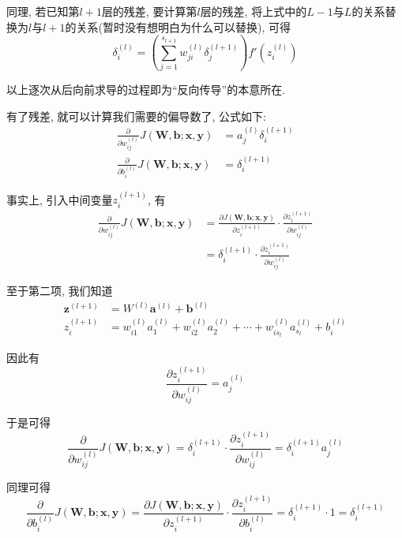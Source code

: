 \documentclass[a4paper,UTF8]{ctexart}
\theoremstyle{plain} \newtheorem{theorem}{定理}[section]
\theoremstyle{plain} \newtheorem{definition}{定义}[section]
\theoremstyle{plain} \newtheorem{lemma}{引理}[section]
\theoremstyle{plain} \newtheorem{proposition}{命题}[section]
\theoremstyle{plain} \newtheorem{example}{例}[section]
\theoremstyle{plain} \newtheorem{remark}{注}[section]
\theoremstyle{plain} \newtheorem{corollary}{推论}[section]
\begin{document}
\begin{enumerate}[(1)]
同理, 若已知第$l + 1$层的残差, 要计算第$l$层的残差, 将上式中的$L - 1$与$L$的关系替换为$l$与$l + 1$的关系(暂时没有想明白为什么可以替换), 可得
\begin{equation*}
\delta_{i}^{(l)} = \left( \sum_{j=1}^{s_{l+1}} w_{ji}^{(l)} \delta_{j}^{(l+1)} \right) f'(z_{i}^{(l)})
\end{equation*}

以上逐次从后向前求导的过程即为“反向传导”的本意所在.
\end{enumerate}

有了残差, 就可以计算我们需要的偏导数了, 公式如下:
\begin{align*}
\frac{\partial}{\partial w_{ij}^{(l)}} J(\bm{W},\bm{b};\bm{x},\bm{y}) & = a_{j}^{(l)} \delta_{i}^{(l+1)} \\ 
\frac{\partial}{\partial b_{i}^{(l)}} J(\bm{W},\bm{b};\bm{x},\bm{y}) & = \delta_{i}^{(l+1)}
\end{align*}

事实上, 引入中间变量$z_{i}^{(l+1)}$, 有
\begin{align*}
\frac{\partial}{\partial w_{ij}^{(l)}} J(\bm{W},\bm{b};\bm{x},\bm{y}) & = \frac{\partial J(\bm{W},\bm{b};\bm{x},\bm{y})}{\partial z_{i}^{(l+1)}} \cdot \frac{\partial z_{i}^{(l+1)}}{\partial w_{ij}^{(l)}} \\ 
& = \delta_{i}^{(l+1)} \cdot \frac{\partial z_{i}^{(l+1)}}{\partial w_{ij}^{(l)}}
\end{align*}

至于第二项, 我们知道
\begin{align*}
\bm{z}^{(l+1)} & = W^{(l)} \bm{a}^{(l)} + \bm{b}^{(l)} \\ 
z_{i}^{(l+1)} & = w_{i1}^{(l)} a_{1}^{(l)} + w_{i2}^{(l)} a_{2}^{(l)} + \cdots + w_{is_{l}}^{(l)} a_{s_l}^{(l)} + b_{i}^{(l)}
\end{align*}

因此有
\begin{equation*}
\frac{\partial z_{i}^{(l+1)}}{\partial w_{ij}^{(l)}} = a_{j}^{(l)}
\end{equation*}

于是可得
\begin{equation*}
\frac{\partial}{\partial w_{ij}^{(l)}} J(\bm{W},\bm{b};\bm{x},\bm{y}) = \delta_{i}^{(l+1)} \cdot \frac{\partial z_{i}^{(l+1)}}{\partial w_{ij}^{(l)}} =  \delta_{i}^{(l+1)} a_{j}^{(l)}
\end{equation*}

同理可得
\begin{equation*}
\frac{\partial}{\partial b_{i}^{(l)}} J(\bm{W},\bm{b};\bm{x},\bm{y}) = \frac{\partial J(\bm{W},\bm{b};\bm{x},\bm{y})}{\partial z_{i}^{(l+1)}} \cdot \frac{\partial z_{i}^{(l+1)}}{\partial b_{i}^{(l)}} = \delta_{i}^{(l+1)} \cdot 1 = \delta_{i}^{(l+1)}
\end{equation*}
\end{document}
